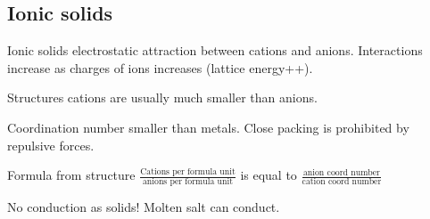 \begin{mdframed}
    \subsection{Ionic solids}

    \begin{multicols}{3}
\begin{compactdesc}
    \item[Ionic solids] electrostatic attraction between cations and anions.
        Interactions increase as charges of ions increases (lattice energy++).
    \item[Structures] cations are usually much smaller than anions.
    \item[Coordination number] smaller than metals.
        Close packing is prohibited by repulsive forces.
    \item[Formula from structure]
        $\frac
            {\text{Cations per formula unit}}
            {\text{anions per formula unit}}
        $  is equal to
        $ \frac
            {\text{anion coord number}}
            {\text{cation coord number}} $
    \item[No conduction] as solids! Molten salt can conduct.
    \end{compactdesc}
\end{multicols}
\end{mdframed}



